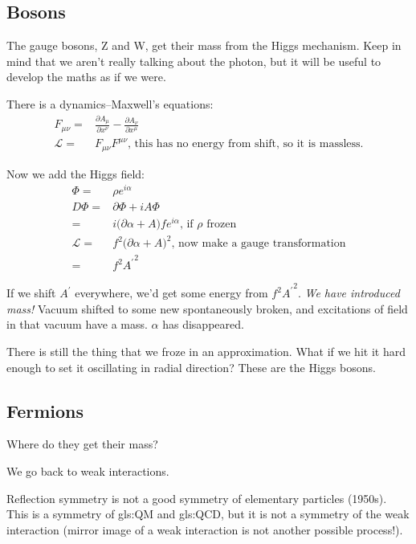 \documentclass[]{article}
\begin{document}
\subsection{Bosons}

The gauge bosons, Z and W, get their mass from the Higgs mechanism. Keep in mind that we aren't really talking about the photon, but it will be useful to develop the maths as if we were.

There is a dynamics--Maxwell's equations:
\begin{align*}
	F_{\mu\nu}=&\frac{\partial A_\mu}{\partial x^\nu}-\frac{\partial A_\nu}{\partial x^\mu}\\
	\mathcal{L} =& F_{\mu\nu} F^{\mu\nu} \text{, this has no energy from shift, so it is massless.}
\end{align*}

Now we add the Higgs field:
\begin{align*}
	\Phi =& \rho e^{i \alpha}\\
	D \Phi =& \partial \Phi + i A \Phi\\
	=& i \big( \partial \alpha + A \big) f e^{i \alpha} \text{, if $\rho$ frozen}\\
	\mathcal{L} =& f^2 \big(\partial \alpha + A \big)^2 \text{, now make a gauge transformation}\\
	=& f^2 {A^\prime}^2
\end{align*}

If we shift $A^\prime$ everywhere, we'd get some energy from $f^2 {A^\prime}^2$. \emph{We have introduced mass!} Vacuum shifted to some new spontaneously broken, and excitations of field in that vacuum have a mass. $\alpha$ has disappeared.

There is still the thing that we froze in an approximation. What if we hit it hard enough to set it oscillating in radial direction? These are the Higgs bosons.
 
\subsection{Fermions}

Where do they get their mass?

We go back to weak interactions.

Reflection symmetry is not a good symmetry of elementary particles (1950s). This is a symmetry of \gls{gls:QM} and \gls{gls:QCD}, but it is not a symmetry of the weak interaction (mirror image of a weak interaction is not another possible process!). 
\end{document}
